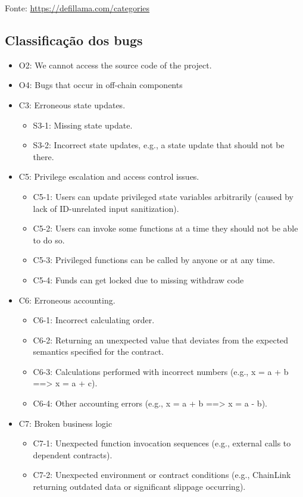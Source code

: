 \documentclass[11pt]{article}
\begin{document}
Fonte: \url{https://defillama.com/categories}
\subsection{Classificação dos bugs}
\label{sec:org1eabfe8}
\begin{itemize}
\item O2: We cannot access the source code of the project.
\item O4: Bugs that occur in off-chain components
\item C3: Erroneous state updates.
\begin{itemize}
\item S3-1: Missing state update.
\item S3-2: Incorrect state updates, e.g., a state update that should not be there.
\end{itemize}
\item C5: Privilege escalation and access control issues.
\begin{itemize}
\item C5-1: Users can update privileged state variables arbitrarily (caused by lack of ID-unrelated input sanitization).
\item C5-2: Users can invoke some functions at a time they should not be able to do so.
\item C5-3: Privileged functions can be called by anyone or at any time.
\item C5-4: Funds can get locked due to missing withdraw code
\end{itemize}
\item C6: Erroneous accounting.
\begin{itemize}
\item C6-1: Incorrect calculating order.
\item C6-2: Returning an unexpected value that deviates from the expected semantics specified for the contract.
\item C6-3: Calculations performed with incorrect numbers (e.g., x = a + b ==> x = a + c).
\item C6-4: Other accounting errors (e.g., x = a + b ==> x = a - b).
\end{itemize}
\item C7: Broken business logic
\begin{itemize}
\item C7-1: Unexpected function invocation sequences (e.g., external calls to dependent contracts).
\item C7-2: Unexpected environment or contract conditions (e.g., ChainLink returning outdated data or significant slippage occurring).

\end{itemize}
\end{itemize}
\end{document}
